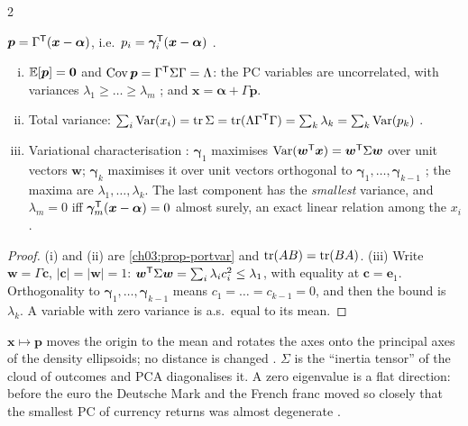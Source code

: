 \begin{paracol}{2}
\begin{definition}
$\bm p=\Gamma^{\mathsf T}(\bm x-\bm\alpha)$, i.e.\ $p_i=\bm\gamma_i^{\mathsf T}(\bm x-\bm\alpha)$ .
\end{definition}

\begin{proposition}\label{ch03:prop-pca}
\leavevmode
\begin{enumerate}[(i)]
  \item $\mathbb{E}[\bm p]=\bm0$ and $\operatorname{Cov}\bm p=\Gamma^{\mathsf T}\Sigma\Gamma=\Lambda$: the PC variables are uncorrelated, with variances
        $\lambda_1\ge\dots\ge\lambda_m$ ; and $\bm x=\bm\alpha+\Gamma\bm p$.
  \item Total variance: $\sum_i\operatorname{Var}(x_i)=\operatorname{tr}\Sigma=\operatorname{tr}(\Lambda\Gamma^{\mathsf T}\Gamma)=\sum_k\lambda_k=\sum_k\operatorname{Var}(p_k)$ .
  \item Variational characterisation : $\bm\gamma_1$ maximises $\operatorname{Var}(\bm w^{\mathsf T}\bm x)=\bm w^{\mathsf T}\Sigma\bm w$ over unit vectors
        $\bm w$; $\bm\gamma_k$ maximises it over unit vectors orthogonal to $\bm\gamma_1,\dots,\bm\gamma_{k-1}$ ; the
        maxima are $\lambda_1,\dots,\lambda_k$. The last component has the \emph{smallest} variance, and $\lambda_m=0$ iff
        $\bm\gamma_m^{\mathsf T}(\bm x-\bm\alpha)=0$ almost surely, an exact linear relation among the $x_i$.
\end{enumerate}
\end{proposition}
\begin{proof}
(i) and (ii) are \cref{ch03:prop-portvar} and $\operatorname{tr}(AB)=\operatorname{tr}(BA)$. (iii) Write $\bm w=\Gamma\bm c$, $|\bm c|=|\bm w|=1$:
$\bm w^{\mathsf T}\Sigma\bm w=\sum_i\lambda_ic_i^2\le\lambda_1$, with equality at $\bm c=\bm e_1$. Orthogonality to $\bm\gamma_1,\dots,\bm\gamma_{k-1}$
means $c_1=\dots=c_{k-1}=0$, and then the bound is $\lambda_k$. A variable with zero variance is a.s.\ equal to its mean.
\end{proof}

\begin{intuition}
$\bm x\mapsto\bm p$ moves the origin to the mean and rotates the axes onto the principal axes of the
density ellipsoids; no distance is changed . $\Sigma$ is the ``inertia tensor'' of the cloud of
outcomes and PCA diagonalises it. A zero eigenvalue is a flat direction: before the euro the Deutsche Mark and
the French franc moved so closely that the smallest PC of currency returns was almost degenerate
.
\end{intuition}


\end{paracol}
